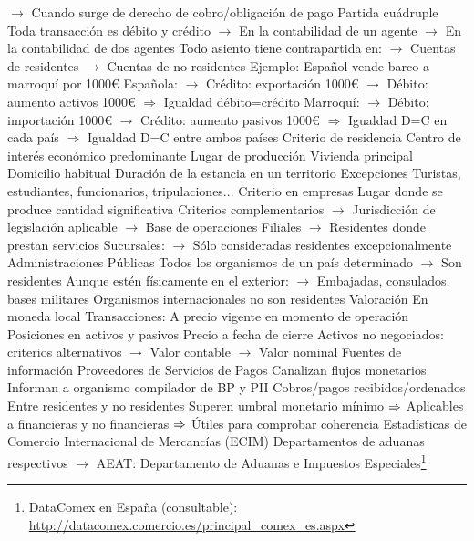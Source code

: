 \documentclass{nuevotema}
\begin{document}
\begin{esquemal}
				\4[] $\to$ Cuando surge de derecho de cobro/obligación de pago
				\4 Partida cuádruple
				\4[] Toda transacción es débito y crédito
				\4[] $\to$ En la contabilidad de un agente
				\4[] $\to$ En la contabilidad de dos agentes
				\4[] Todo asiento tiene contrapartida en:
				\4[] $\to$ Cuentas de residentes
				\4[] $\to$ Cuentas de no residentes
				\4 Ejemplo:
				\4[] Español vende barco a marroquí por 1000€
				\4[] Española:
				\4[] $\to$ Crédito: exportación 1000€
				\4[] $\to$ Débito: aumento activos 1000€
				\4[] $\Rightarrow$ Igualdad débito=crédito
				\4[] Marroquí:
				\4[] $\to$ Débito: importación 1000€
				\4[] $\to$ Crédito: aumento pasivos 1000€
				\4[] $\Rightarrow$ Igualdad D=C en cada país
				\4[] $\Rightarrow$ Igualdad D=C entre ambos países
			\3 Criterio de residencia
				\4 Centro de interés económico predominante
				\4[] Lugar de producción
				\4[] Vivienda principal
				\4[] Domicilio habitual
				\4[] Duración de la estancia en un territorio
				\4 Excepciones
				\4[] Turistas, estudiantes, funcionarios, tripulaciones...
				\4 Criterio en empresas
				\4[] Lugar donde se produce cantidad significativa
				\4[] Criterios complementarios
				\4[] $\to$ Jurisdicción de legislación aplicable
				\4[] $\to$ Base de operaciones
				\4[] Filiales
				\4[] $\to$ Residentes donde prestan servicios
				\4[] Sucursales:
				\4[] $\to$ Sólo consideradas residentes excepcionalmente
				\4 Administraciones Públicas
				\4[] Todos los organismos de un país determinado
				\4[] $\to$ Son residentes
				\4[] Aunque estén físicamente en el exterior:
				\4[] $\to$ Embajadas, consulados, bases militares
				\4[] Organismos internacionales no son residentes
			\3 Valoración
				\4 En moneda local
				\4 Transacciones:
				\4[] A precio vigente en momento de operación
				\4 Posiciones en activos y pasivos
				\4[] Precio a fecha de cierre
				\4[] Activos no negociados: criterios alternativos
				\4[] $\to$ Valor contable
				\4[] $\to$ Valor nominal
			\3 Fuentes de información
				\4 Proveedores de Servicios de Pagos
				\4[] Canalizan flujos monetarios
				\4[] Informan a organismo compilador de BP y PII
				\4[] Cobros/pagos recibidos/ordenados
				\4[] Entre residentes y no residentes
				\4[] Superen umbral monetario mínimo
				\4[] $\Rightarrow$ Aplicables a financieras y no financieras
				\4[] $\Rightarrow$ Útiles para comprobar coherencia
				\4 Estadísticas de Comercio Internacional de Mercancías (ECIM)
				\4[] Departamentos de aduanas respectivos
				\4[] $\to$ AEAT: Departamento de Aduanas e Impuestos Especiales\footnote{DataComex en España (consultable): \url{http://datacomex.comercio.es/principal\_comex\_es.aspx}}

\end{esquemal}
\end{document}
